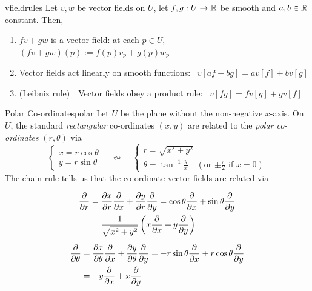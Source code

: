 \begin{lemm}{}{vfieldrules}
Let $v,w$ be vector fields on $U$, let $f,g:U\to\R$ be smooth and $a,b\in\R$ constant. Then,
\begin{enumerate}
  \item $fv+gw$ is a vector field: at each $p\in U$, $(fv+gw)(p):=f(p)v_p+g(p)w_p$
	\item Vector fields act linearly on smooth functions: \ $v[af+bg]=av[f]+bv[g]$
	\item (Leibniz rule)\ \ Vector fields obey a product rule: \ $v[fg]=fv[g]+gv[f]$
\end{enumerate} 
\end{lemm}

\begin{example}{Polar Co-ordinates}{polar}
Let $U$ be the plane without the non-negative $x$-axis. On $U$, the standard \emph{rectangular} co-ordinates $(x,y)$ are related to the \emph{polar co-ordinates} $(r,\theta)$ via
\[\begin{cases}
x=r\cos\theta\\
y=r\sin\theta
\end{cases}\quad\leftrightsquigarrow\quad
\begin{cases}
r=\sqrt{x^2+y^2}\\
\theta=\tan^{-1}\frac yx\quad (\text{or $\pm\frac\pi 2$ if $x=0$})
\end{cases}\]
The chain rule tells us that the co-ordinate vector fields are related via\par
\begin{minipage}[t]{0.6\linewidth}\vspace{-10pt}
\begin{gather*}
\begin{aligned}
\partials r&=\partials[x]{r}\partials x+\partials[y]{r}\partials{y} =\cos\theta\partials x+\sin\theta\partials y\\
&=\frac 1{\sqrt{x^2+y^2}}\left(x\partials x+y\partials y\right)
\end{aligned}\\[5pt]
\begin{aligned}
\partials\theta&=\partials[x]{\theta}\partials x+\partials[y]{\theta}\partials{y} =-r\sin\theta\partials x+r\cos\theta\partials y\\
&=-y\partials x+x\partials y
\end{aligned}
\end{gather*}
\end{minipage}\hfill\begin{minipage}[t]{0.39\linewidth}\vspace{0pt}

\end{minipage}
\end{example}
